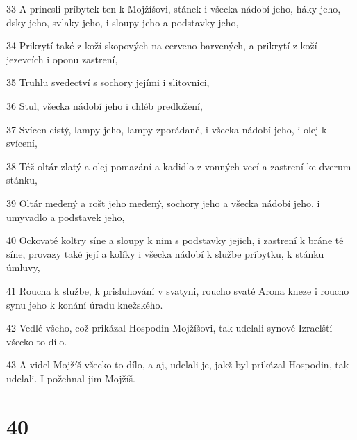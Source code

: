\par 33 A prinesli príbytek ten k Mojžíšovi, stánek i všecka nádobí jeho, háky jeho, dsky jeho, svlaky jeho, i sloupy jeho a podstavky jeho,
\par 34 Prikrytí také z koží skopových na cerveno barvených, a prikrytí z koží jezevcích i oponu zastrení,
\par 35 Truhlu svedectví s sochory jejími i slitovnici,
\par 36 Stul, všecka nádobí jeho i chléb predložení,
\par 37 Svícen cistý, lampy jeho, lampy zporádané, i všecka nádobí jeho, i olej k svícení,
\par 38 Též oltár zlatý a olej pomazání a kadidlo z vonných vecí a zastrení ke dverum stánku,
\par 39 Oltár medený a rošt jeho medený, sochory jeho a všecka nádobí jeho, i umyvadlo a podstavek jeho,
\par 40 Ockovaté koltry síne a sloupy k nim s podstavky jejich, i zastrení k bráne té síne, provazy také její a kolíky i všecka nádobí k službe príbytku, k stánku úmluvy,
\par 41 Roucha k službe, k prisluhování v svatyni, roucho svaté Arona kneze i roucho synu jeho k konání úradu knežského.
\par 42 Vedlé všeho, což prikázal Hospodin Mojžíšovi, tak udelali synové Izraelští všecko to dílo.
\par 43 A videl Mojžíš všecko to dílo, a aj, udelali je, jakž byl prikázal Hospodin, tak udelali. I požehnal jim Mojžíš.

\chapter{40}

